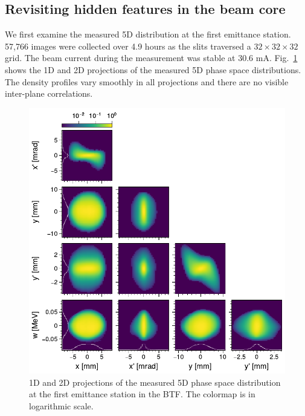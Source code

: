 \documentclass[letterpaper,
               keeplastbox,
               nospread,
               biblatex,
              ]{jacow}
\begin{document}
\subsection{Revisiting hidden features in the beam core}

We first examine the measured 5D distribution at the first emittance station. 57,766 images were collected over 4.9 hours as the slits traversed a $32 \times 32 \times 32$ grid. The beam current during the measurement was stable at 30.6 mA. Fig.~\ref{fig:VS06_corner} shows the 1D and 2D projections of the measured 5D phase space distributions. The density profiles vary smoothly in all projections and there are no visible inter-plane correlations.
%
\begin{figure}[!b] 
    \centering
    \includegraphics[width=\columnwidth]{VS06_corner_cbar.pdf}
    \caption{1D and 2D projections of the measured 5D phase space distribution at the first emittance station in the BTF. The colormap is in logarithmic scale.}
    \label{fig:VS06_corner}
\end{figure}
%
\end{document}
